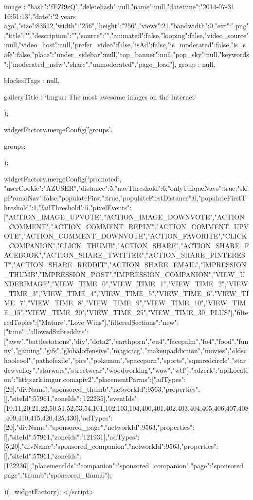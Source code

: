 {{{{            image               : {"hash":"fEZl9zQ","deletehash":null,"name":null,"datetime":"2014-07-31 10:51:13","date":"2 years ago","size":83512,"width":"256","height":"256","views":21,"bandwidth":0,"ext":".png","title":"","description":"","source":"","animated":false,"looping":false,"video_source":null,"video_host":null,"prefer_video":false,"isAd":false,"is_moderated":false,"is_safe":false,"place":{"under_sidebar":null,"top_banner":null,"pop_sky":null,"keywords":["moderated_nsfw","share","unmoderated","page_load"]}},
            group               : null,
        
            blockedTags         : null,
        
        
            galleryTitle        : 'Imgur: The most awesome images on the Internet'
        });

        widgetFactory.mergeConfig('groups', {
            groups: {
                
            }
        });

        widgetFactory.mergeConfig('promoted', {"userCookie":"AZUSER","distance":5,"navThreshold":6,"onlyUniqueNavs":true,"skipPromoNav":false,"populateFirst":true,"populateFirstDistance":0,"populateFirstThreshold":1,"failThreshold":5,"pixelEvents":["ACTION_IMAGE_UPVOTE","ACTION_IMAGE_DOWNVOTE","ACTION_COMMENT","ACTION_COMMENT_REPLY","ACTION_COMMENT_UPVOTE","ACTION_COMMENT_DOWNVOTE","ACTION_FAVORITE","CLICK_COMPANION","CLICK_THUMB","ACTION_SHARE","ACTION_SHARE_FACEBOOK","ACTION_SHARE_TWITTER","ACTION_SHARE_PINTEREST","ACTION_SHARE_REDDIT","ACTION_SHARE_EMAIL","IMPRESSION_THUMB","IMPRESSION_POST","IMPRESSION_COMPANION","VIEW_UNDERIMAGE","VIEW_TIME_0","VIEW_TIME_1","VIEW_TIME_2","VIEW_TIME_3","VIEW_TIME_4","VIEW_TIME_5","VIEW_TIME_6","VIEW_TIME_7","VIEW_TIME_8","VIEW_TIME_9","VIEW_TIME_10","VIEW_TIME_15","VIEW_TIME_20","VIEW_TIME_25","VIEW_TIME_30_PLUS"],"filteredTopics":["Mature","Love Wins"],"filteredSections":{"new":["time"]},"allowedSubreddits":["aww","battlestations","diy","dota2","earthporn","eu4","facepalm","fo4","food","funny","gaming","gifs","globaloffensive","magictcg","makeupaddiction","movies","oldschoolcool","pathofexile","pics","pokemon","spaceporn","sports","squaredcircle","stardewvalley","starwars","streetwear","woodworking","wow","wtf"],"adzerk":{"apiLocation":"http:\/\/zrk.imgur.com\/api\/v2","placementParms":[{"adTypes":[20],"divName":"sponsored_thumb","networkId":9563,"properties":[],"siteId":57961,"zoneIds":[122235],"eventIds":[10,11,20,21,22,50,51,52,53,54,101,102,103,104,400,401,402,403,404,405,406,407,408,409,410,415,420,425,430]},{"adTypes":[20],"divName":"sponsored_page","networkId":9563,"properties":[],"siteId":57961,"zoneIds":[121931]},{"adTypes":[5,20],"divName":"sponsored_companion","networkId":9563,"properties":[],"siteId":57961,"zoneIds":[122236]}],"placementIds":{"companion":"sponsored_companion","page":"sponsored_page","thumb":"sponsored_thumb"}}});
    })(_widgetFactory);
    </script>

}}
